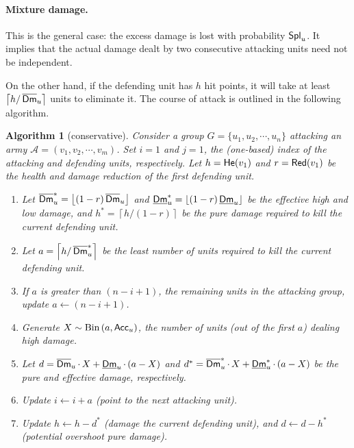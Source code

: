 \documentclass{article}
\newcommand{\ceil}[1]{\left\lceil #1 \right\rceil}
\newcommand{\floor}[1]{\left\lfloor #1 \right\rfloor}
\newcommand{\overwr}{\leftarrow}
\newcommand{\cA}{\mathcal{A}}
\DeclareMathOperator{\He}{{\sf He}} %
\DeclareMathOperator{\DLow}{\underline{\sf Dm}} %
\DeclareMathOperator{\DHigh}{\overline{\sf Dm}} %
\DeclareMathOperator{\Acc}{{\sf Acc}} %
\DeclareMathOperator{\Spl}{{\sf Spl}} %
\DeclareMathOperator{\Red}{{\sf Red}} %
\newtheorem{algorithm}{Algorithm}
\numberwithin{equation}{section}
\begin{document}
\paragraph*{Mixture damage.}

This is the general case: the excess damage is lost with probability $\Spl _u$. It implies that the actual damage dealt by two consecutive attacking units need not be independent.

On the other hand, if the defending unit has $h$ hit points, it will take at least $\ceil{h / \DHigh _u}$ units to eliminate it. The course of attack is outlined in the following algorithm.
\begin{algorithm}[conservative]\label{alg:conservative}
    Consider a group $G = \{ u_1, u_2, \cdots , u_n \}$ attacking an army $\cA = (v_1, v_2, \cdots , v_m)$.
    Set $i = 1$ and $j = 1$, the (one-based) index of the attacking and defending units, respectively. Let $h = \He (v_1)$ and $r = \Red (v_1)$ be the health and damage reduction of the first defending unit.
    \begin{enumerate}
        \item \label{step:first_conservative} Let $\DHigh _u ^* = \floor{(1 - r) \DHigh _u}$ and $\DLow _u ^* = \floor{(1 - r) \DLow _u}$ be the effective high and low damage, and $h^* = \ceil{h / (1 - r)}$ be the pure damage required to kill the current defending unit.

        \item Let $a = \ceil{h / \DHigh _u ^*}$ be the least number of units required to kill the current defending unit.

        \item If $a$ is greater than $(n - i + 1)$, the remaining units in the attacking group, update $a \overwr (n - i + 1)$.

        \item Generate $X \sim \mathrm{Bin} \left(a, \Acc _u \right)$, the number of units (out of the first $a$) dealing high damage.
         
        \item Let $d = \DHigh _u \cdot \, X + \DLow _u \cdot \, (a - X)$ and $d^* = \DHigh _u ^* \cdot \, X + \DLow _u ^* \cdot \, (a - X)$ be the pure and effective damage, respectively.

        \item Update $i \overwr i + a$ (point to the next attacking unit).

        \item Update $h \overwr h - d^*$ (damage the current defending unit), and $d \overwr d - h^*$ (potential overshoot pure damage).


\end{enumerate}
\end{algorithm}
\end{document}
